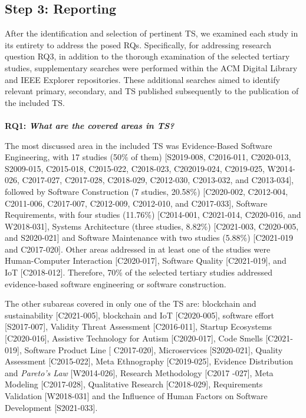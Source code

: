 \documentclass[sigconf]{acmart}
\begin{document}
\subsection{Step 3: Reporting}
\label{sec:algorithm_evaluation}

After the identification and selection of pertinent TS, we examined each study in its entirety to address the posed RQs. Specifically, for addressing research question RQ3, in addition to the thorough examination of the selected tertiary studies, supplementary searches were performed within the ACM Digital Library and IEEE Explorer repositories. These additional searches aimed to identify relevant primary, secondary, and TS published subsequently to the publication of the included TS.
\\\\
\textbf{RQ1: \textit{What are the covered areas in TS?}}

The most discussed area in the included TS was Evidence-Based Software Engineering, with 17 studies (50\% of them) [S2019-008, C2016-011, C2020-013, S2009-015, C2015-018, C2015-022, C2018-023, C202019-024, C2019-025, W2014-026, C2017-027, C2017-028, C2018-029, C2012-030, C2013-032, and C2013-034], followed by Software Construction (7 studies, 20.58\%) [C2020-002, C2012-004, C2011-006, C2017-007, C2012-009, C2012-010, and C2017-033], Software Requirements, with four studies (11.76\%) [C2014-001, C2021-014, C2020-016, and W2018-031], Systems Architecture (three studies, 8.82\%) [C2021-003, C2020-005, and S2020-021] and Software Maintenance with two studies (5.88\%) [C2021-019 and C2017-020].
Other areas addressed in at least one of the studies were Human-Computer Interaction [C2020-017], Software Quality [C2021-019], and IoT [C2018-012]. Therefore, 70\% of the selected tertiary studies addressed evidence-based software engineering or software construction. 

The other subareas covered in only one of the TS are: blockchain and sustainability [C2021-005], blockchain and IoT [C2020-005], software effort [S2017-007], Validity Threat Assessment [C2016-011], Startup Ecosystems [C2020-016], Assistive Technology for Autism [C2020-017], Code Smells [C2021-019], Software Product Line [ C2017-020], Microservices [S2020-021], Quality Assessment [C2015-022], Meta Ethnography [C2019-025], Evidence Distribution and \textit{Pareto's Law} [W2014-026], Research Methodology [C2017 -027], Meta Modeling [C2017-028], Qualitative Research [C2018-029], Requirements Validation [W2018-031] and the Influence of Human Factors on Software Development [S2021-033].\\
\end{document}
